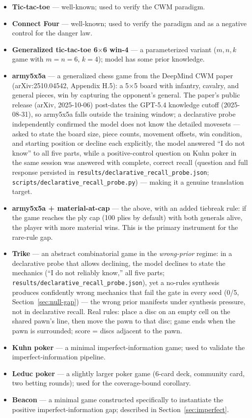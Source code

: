 \documentclass[11pt]{article}
\theoremstyle{remark}
\begin{document}
\begin{itemize}
\item \textbf{Tic-tac-toe} --- well-known; used to verify the CWM paradigm.
\item \textbf{Connect Four} --- well-known; used to verify the paradigm and as a negative control for the danger law.
\item \textbf{Generalized tic-tac-toe 6$\times$6 win-4} --- a parameterized variant ($m,n,k$ game with $m=n=6$, $k=4$); model has some prior knowledge.
\item \textbf{army5x5a} --- a generalized chess game from the DeepMind CWM paper (arXiv:2510.04542, Appendix H.5): a 5$\times$5 board with infantry, cavalry, and general pieces, win by capturing the opponent's general. The paper's public release (arXiv, 2025-10-06) post-dates the GPT-5.4 knowledge cutoff (2025-08-31), so army5x5a falls outside the training window; a declarative probe independently confirmed the model does not know the detailed movesets --- asked to state the board size, piece counts, movement offsets, win condition, and starting position or decline each explicitly, the model answered ``I do not know'' to all five parts, while a positive-control question on Kuhn poker in the same session was answered with complete, correct recall (question and full response persisted in \texttt{results/declarative\_recall\_probe.json}; \texttt{scripts/declarative\_recall\_probe.py}) --- making it a genuine translation target.
\item \textbf{army5x5a + material-at-cap} --- the above, with an added tiebreak rule: if the game reaches the ply cap (100 plies by default) with both generals alive, the player with more material wins. This is the primary instrument for the rare-rule gap.
\item \textbf{Trike} \citep{erickson2020trike} --- an abstract combinatorial game in the \emph{wrong-prior} regime: in a declarative probe that allows declining, the model declines to state the mechanics (``I do not reliably know,'' all five parts; \texttt{results/declarative\_recall\_probe.json}), yet a no-rules synthesis produces confidently wrong mechanics that fail the gate in every seed (0/5, Section~\ref{sec:null-gap}) --- the wrong prior manifests under synthesis pressure, not in declarative recall. Real rules: place a disc on an empty cell on the shared pawn's line, then move the pawn to that disc; game ends when the pawn is surrounded; score = discs adjacent to the pawn.
\item \textbf{Kuhn poker} \citep{kuhn1950poker} --- a minimal imperfect-information game; used to validate the imperfect-information pipeline.
\item \textbf{Leduc poker} \citep{southey2005leduc} --- a slightly larger poker game (6-card deck, community card, two betting rounds); used for the coverage-bound corollary.
\item \textbf{Beacon} --- a minimal game constructed specifically to instantiate the positive imperfect-information gap; described in Section~\ref{sec:imperfect}.
\end{itemize}
\end{document}
